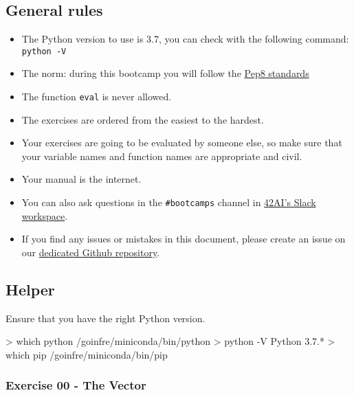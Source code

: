 \documentclass[]{article}
\newenvironment{Shaded}{\begin{snugshade}}{\end{snugshade}}
\newcommand{\NormalTok}[1]{\textcolor[rgb]{0.81,0.81,0.76}{#1}}
\begin{document}
\hypertarget{general-rules}{%
\subsection{General rules}\label{general-rules}}

\begin{itemize}
\item
  The Python version to use is 3.7, you can check with the following
  command: \texttt{python\ -V}
\item
  The norm: during this bootcamp you will follow the
  \href{https://www.python.org/dev/peps/pep-0008/}{Pep8 standards}
\item
  The function \texttt{eval} is never allowed.
\item
  The exercises are ordered from the easiest to the hardest.
\item
  Your exercises are going to be evaluated by someone else, so make sure
  that your variable names and function names are appropriate and civil.
\item
  Your manual is the internet.
\item
  You can also ask questions in the \texttt{\#bootcamps} channel in
  \href{https://42-ai.slack.com}{42AI's Slack workspace}.
\item
  If you find any issues or mistakes in this document, please create an
  issue on our
  \href{https://github.com/42-AI/bootcamp_machine-learning/issues}{dedicated
  Github repository}.
\end{itemize}

\hypertarget{helper}{%
\subsection{Helper}\label{helper}}

Ensure that you have the right Python version.

\begin{Shaded}
\begin{Highlighting}[]
\NormalTok{> which python}
\NormalTok{/goinfre/miniconda/bin/python}
\NormalTok{> python -V}
\NormalTok{Python 3.7.*}
\NormalTok{> which pip}
\NormalTok{/goinfre/miniconda/bin/pip}
\end{Highlighting}
\end{Shaded}

\hypertarget{exercise-00---the-vector}{%
\subsubsection{Exercise 00 - The
Vector}\label{exercise-00---the-vector}}
\end{document}
